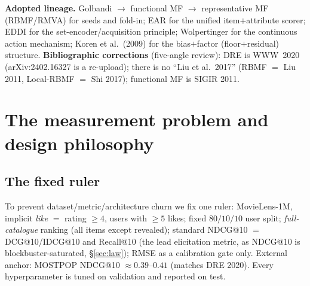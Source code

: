 \documentclass[11pt]{article}
\begin{document}
\noindent\textbf{Adopted lineage.} Golbandi $\to$ functional MF $\to$ representative MF (RBMF/RMVA) for seeds and
fold-in; EAR for the unified item$+$attribute scorer; EDDI for the set-encoder/acquisition principle;
Wolpertinger for the continuous action mechanism; Koren et al.\ (2009) for the bias$+$factor (floor$+$residual)
structure. \textbf{Bibliographic corrections} (five-angle review): DRE is WWW~2020 (arXiv:2402.16327 is a
re-upload); there is no ``Liu et al.\ 2017'' (RBMF $=$ Liu 2011, Local-RBMF $=$ Shi 2017); functional MF is SIGIR
2011.

\section{The measurement problem and design philosophy}\label{sec:measure}

\subsection{The fixed ruler}
To prevent dataset/metric/architecture churn we fix one ruler: MovieLens-1M, implicit \emph{like} $=$ rating
$\ge 4$, users with $\ge 5$ likes; fixed $80/10/10$ user split; \emph{full-catalogue} ranking (all items except
revealed); standard NDCG@10 $=$ DCG@10/IDCG@10 and Recall@10 (the lead elicitation metric, as NDCG@10 is
blockbuster-saturated, \S\ref{sec:law}); RMSE as a calibration gate only. External anchor: MOSTPOP NDCG@10
$\approx 0.39$--$0.41$ (matches DRE 2020). Every hyperparameter is tuned on validation and reported on test.
\end{document}

